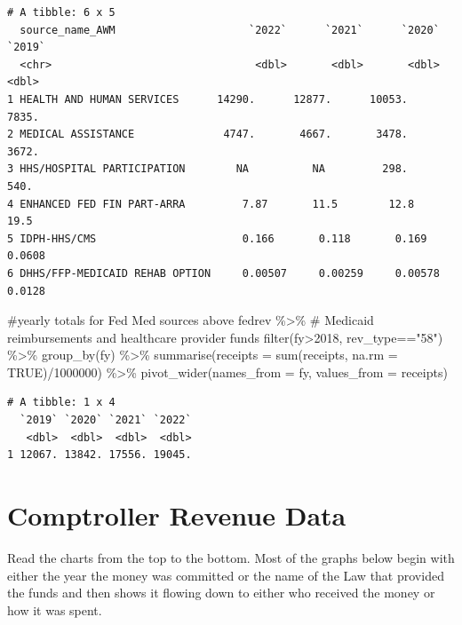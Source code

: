 \documentclass[
  letterpaper,
  DIV=11,
  numbers=noendperiod]{scrreport}
\newenvironment{Shaded}{\begin{snugshade}}{\end{snugshade}}
\newcommand{\AttributeTok}[1]{\textcolor[rgb]{0.40,0.45,0.13}{#1}}
\newcommand{\CommentTok}[1]{\textcolor[rgb]{0.37,0.37,0.37}{#1}}
\newcommand{\ConstantTok}[1]{\textcolor[rgb]{0.56,0.35,0.01}{#1}}
\newcommand{\DecValTok}[1]{\textcolor[rgb]{0.68,0.00,0.00}{#1}}
\newcommand{\FunctionTok}[1]{\textcolor[rgb]{0.28,0.35,0.67}{#1}}
\newcommand{\NormalTok}[1]{\textcolor[rgb]{0.00,0.23,0.31}{#1}}
\newcommand{\SpecialCharTok}[1]{\textcolor[rgb]{0.37,0.37,0.37}{#1}}
\newcommand{\StringTok}[1]{\textcolor[rgb]{0.13,0.47,0.30}{#1}}
\begin{document}
\begin{verbatim}
# A tibble: 6 x 5
  source_name_AWM                     `2022`      `2021`      `2020`    `2019`
  <chr>                                <dbl>       <dbl>       <dbl>     <dbl>
1 HEALTH AND HUMAN SERVICES      14290.      12877.      10053.      7835.    
2 MEDICAL ASSISTANCE              4747.       4667.       3478.      3672.    
3 HHS/HOSPITAL PARTICIPATION        NA          NA         298.       540.    
4 ENHANCED FED FIN PART-ARRA         7.87       11.5        12.8       19.5   
5 IDPH-HHS/CMS                       0.166       0.118       0.169      0.0608
6 DHHS/FFP-MEDICAID REHAB OPTION     0.00507     0.00259     0.00578    0.0128
\end{verbatim}

\begin{Shaded}
\begin{Highlighting}[]
\CommentTok{\#yearly totals for Fed Med sources above}
\NormalTok{fedrev }\SpecialCharTok{\%\textgreater{}\%} \CommentTok{\# Medicaid reimbursements and healthcare provider funds}
  \FunctionTok{filter}\NormalTok{(fy}\SpecialCharTok{\textgreater{}}\DecValTok{2018}\NormalTok{, rev\_type}\SpecialCharTok{==}\StringTok{"58"}\NormalTok{) }\SpecialCharTok{\%\textgreater{}\%}
  \FunctionTok{group\_by}\NormalTok{(fy) }\SpecialCharTok{\%\textgreater{}\%} 
  \FunctionTok{summarise}\NormalTok{(}\AttributeTok{receipts =} \FunctionTok{sum}\NormalTok{(receipts, }\AttributeTok{na.rm =} \ConstantTok{TRUE}\NormalTok{)}\SpecialCharTok{/}\DecValTok{1000000}\NormalTok{) }\SpecialCharTok{\%\textgreater{}\%}
  \FunctionTok{pivot\_wider}\NormalTok{(}\AttributeTok{names\_from =}\NormalTok{ fy, }\AttributeTok{values\_from =}\NormalTok{ receipts)}
\end{Highlighting}
\end{Shaded}

\begin{verbatim}
# A tibble: 1 x 4
  `2019` `2020` `2021` `2022`
   <dbl>  <dbl>  <dbl>  <dbl>
1 12067. 13842. 17556. 19045.
\end{verbatim}

\hypertarget{comptroller-revenue-data}{%
\section{Comptroller Revenue Data}\label{comptroller-revenue-data}}

Read the charts from the top to the bottom. Most of the graphs below
begin with either the year the money was committed or the name of the
Law that provided the funds and then shows it flowing down to either who
received the money or how it was spent.
\end{document}
